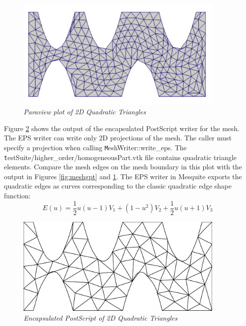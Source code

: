 \begin{figure}[htb!]
\begin{center}
\includegraphics[width=4in]{figures/mesh_vtk}
\caption{\em Paraview plot of 2D Quadratic Triangles \label{fig:meshvtk}}
\end{center}
\end{figure}

Figure \ref{fig:mesh} shows the output of the encapsulated PostScript writer for the mesh.  The EPS writer can write only 2D projections of the mesh.  The caller must specify a projection when calling {\texttt MeshWriter::write\_eps}.  The {\texttt testSuite/higher\_order/homogeneousPart.vtk} file contains quadratic triangle elements.  Compare the mesh edges on the mesh boundary in this plot with the output in Figures \ref{fig:meshgpt} and \ref{fig:meshvtk}.	The EPS writer in Mesquite exports the quadratic edges as curves corresponding to the classic quadratic edge shape function:
\begin{displaymath}
E(u) = \frac{1}{2}u(u-1)V_1 + (1-u^2)V_2 + \frac{1}{2}u(u+1)V_3
\end{displaymath}

\begin{figure}[htb!]
\begin{center}
\includegraphics[width=4in]{figures/mesh}
\caption{\em Encapsulated PostScript of 2D Quadratic Triangles \label{fig:mesh}}
\end{center}
\end{figure}

